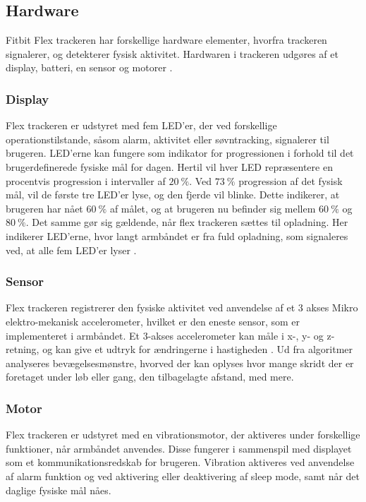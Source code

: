 \subsection{Hardware}
Fitbit Flex trackeren har forskellige hardware elementer, hvorfra trackeren signalerer, og detekterer fysisk aktivitet. Hardwaren i trackeren udgøres af et display, batteri, en sensor og motorer \citep{fitbitflex}.
 
\subsubsection{Display} 
Flex trackeren er udstyret med fem LED'er, der ved forskellige operationstilstande, såsom alarm, aktivitet eller søvntracking, signalerer til brugeren. 
LED'erne kan fungere som indikator for progressionen i forhold til det brugerdefinerede fysiske mål for dagen. Hertil vil hver LED repræsentere en procentvis progression i intervaller af $20~\%$. Ved $73~\%$ progression af det fysisk mål, vil de første tre LED'er lyse, og den fjerde vil blinke. Dette indikerer, at brugeren har nået $60~\%$ af målet, og at brugeren nu befinder sig mellem $60~\%$ og $80~\%$. 
Det samme gør sig gældende, når flex trackeren sættes til opladning. Her indikerer LED'erne, hvor langt armbåndet er fra fuld opladning, som signaleres ved, at alle fem LED'er lyser \citep{fitbitflex}. 

\subsubsection{Sensor} 
Flex trackeren registrerer den fysiske aktivitet ved anvendelse af et 3 akses Mikro elektro-mekanisk accelerometer, hvilket er den eneste sensor, som er implementeret i armbåndet. Et 3-akses accelerometer kan måle i x-, y- og z-retning, og kan give et udtryk for ændringerne i hastigheden \citep{ravi2005}. Ud fra algoritmer analyseres bevægelsesmønstre, hvorved der kan oplyses hvor mange skridt der er foretaget under løb eller gang, den tilbagelagte afstand, med mere. 

\subsubsection{Motor}
Flex trackeren er udstyret med en vibrationsmotor, der aktiveres under forskellige funktioner, når armbåndet anvendes. Disse fungerer i sammenspil med displayet som et kommunikationsredskab for brugeren. Vibration aktiveres ved anvendelse af alarm funktion og ved aktivering eller deaktivering af sleep mode, samt når det daglige fysiske mål nåes. 


